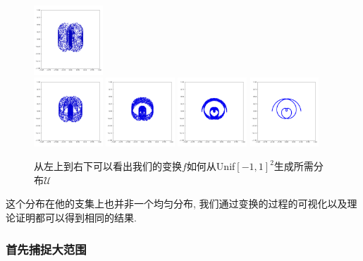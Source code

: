 \documentclass[lang=cn,11pt]{elegantpaper}
\begin{document}
\begin{figure}[hbt]
  \includegraphics[width=0.23\textwidth]{wings_1_8}\\
  \includegraphics[width=0.23\textwidth]{wings_1_9}
  \includegraphics[width=0.23\textwidth]{wings_1_10}
  \includegraphics[width=0.23\textwidth]{wings_1_11}
  \includegraphics[width=0.23\textwidth]{wings_1_12}

  
  \caption{从左上到右下可以看出我们的变换$f$如何从Unif$[-1,1]^2$生成所需分布$\mathcal U$}
\end{figure}

这个分布在他的支集上也并非一个均匀分布, 我们通过变换的过程的可视化以及理论证明都可以得到相同的结果.

\subsubsection{首先捕捉大范围}
\end{document}
